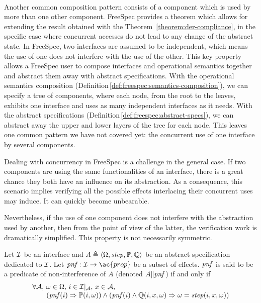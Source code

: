 \paragraph{}
%
Another common composition pattern consists of a component which is used by more
than one other component.
%
FreeSpec provides a theorem which allows for extending the result obtained with
the Theorem~\ref{theorem:der-compliance}, in the specific case where concurrent
accesses do not lead to any change of the abstract state.
%
In FreeSpec, two interfaces are assumed to be independent, which means the use
of one does not interfere with the use of the other.
%
This key property allows a FreeSpec user to compose interfaces and operational
semantics together and abstract them away with abstract specifications.
%
With the operational semantics composition
(Definition\,\ref{def:freespec:semantics-composition}), we can specify a tree of
components, where each node, from the root to the leaves, exhibits one interface
and uses as many independent interfaces as it needs.
%
With the abstract specifications
(Definition\,\ref{def:freespec:abstract-specs}), we can abstract away the upper
and lower layers of the tree for each node.
%
This leaves one common pattern we have not covered yet: the concurrent use of
one interface by several components.

Dealing with concurrency in FreeSpec is a challenge in the general case.
%
If two components are using the same functionalities of an interface, there is a
great chance they both have an influence on its abstraction.
%
As a consequence, this scenario implies verifying all the possible effects
interlacing their concurrent uses may induce. It can quickly become unbearable.

Nevertheless, if the use of one component does not interfere with the
abstraction used by another, then from the point of view of the latter, the
verification work is dramatically simplified.
%
This property is not necessarily symmetric.

\begin{definition}
  Let $\mathcal{I}$ be an interface and
  $A \triangleq \langle \Omega, \mathit{step}, \mathbb{P}, \mathbb{Q} \rangle$ be
  an abstract specification dedicated to $\mathcal{I}$. Let
  $\func{pnf} : \I \rightarrow \ac{prop}$ be a subset of effects. $\mathit{pnf}$
  is said to be a predicate of non-interference of $A$ (denoted
  $A \| \mathit{pnf}$) if and only if \[
    \begin{array}{l}
      \forall \mathcal{A}\text{, } \omega \in \Omega\text{, } i \in
      \mathcal{I}|_{\mathcal{A}}\text{, }x \in \mathcal{A}\text{, } \\ \qquad
      (\mathit{pnf}(i) \Rightarrow \mathbb{P}(i, \omega)) \wedge (\mathit{pnf}(i)
      \wedge \mathbb{Q}(i, x, \omega) \Rightarrow \omega = \mathit{step}(i, x,
      \omega))
    \end{array}
  \]
\end{definition}

